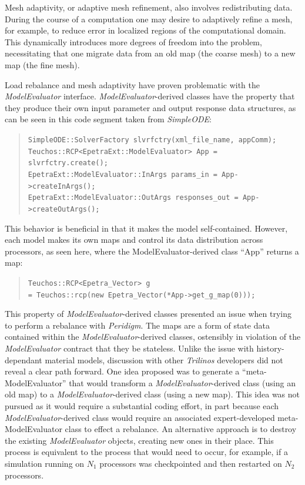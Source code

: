 \documentclass[pdf,ps2pdf,12pt,report]{SANDreport}
\theoremstyle{plain}
\theoremstyle{definition}
\theoremstyle{remark}
\numberwithin{equation}{section}
\begin{document}
Mesh adaptivity, or adaptive mesh refinement, also involves redistributing data. During the course of a computation one may desire to adaptively refine a mesh, for example, to reduce error in localized regions of the computational domain. This dynamically introduces more degrees of freedom into the problem, necessitating that one migrate data from an old map (the coarse mesh) to a new map (the fine mesh).

Load rebalance and mesh adaptivity have proven problematic with the \emph{ModelEvaluator} interface. \emph{ModelEvaluator}-derived classes have the property that they produce their own input parameter and output response data structures, as can be seen in this code segment taken from \emph{SimpleODE}:
\begin{quote}
\vspace{-5pt}
\texttt{SimpleODE::SolverFactory slvrfctry(xml\_file\_name, appComm);}\\
\texttt{Teuchos::RCP<EpetraExt::ModelEvaluator> App = slvrfctry.create();}\\
\texttt{EpetraExt::ModelEvaluator::InArgs params\_in = App->createInArgs();}\\
\texttt{EpetraExt::ModelEvaluator::OutArgs responses\_out = App->createOutArgs();}\\
\vspace{-17pt}
\end{quote}
This behavior is beneficial in that it makes the model self-contained. However, each model makes its own maps and control its data distribution across processors, as seen here, where the ModelEvaluator-derived class ``App'' returns a map:
\begin{quote}
\vspace{-5pt}
\texttt{Teuchos::RCP<Epetra\_Vector> g}\\
\texttt{= Teuchos::rcp(new Epetra\_Vector(*App->get\_g\_map(0)));}\\
\vspace{-17pt}
\end{quote}
This property of \emph{ModelEvaluator}-derived classes presented an issue when trying to perform a rebalance with \emph{Peridigm}. The maps are a form of state data contained within the \emph{ModelEvaluator}-derived classes, ostensibly in violation of the \emph{ModelEvaluator} contract that they be stateless. Unlike the issue with history-dependant material models, discussion with other \emph{Trilinos} developers did not reveal a clear path forward. One idea proposed was to generate a ``meta-ModelEvaluator'' that would transform a \emph{ModelEvaluator}-derived class (using an old map) to a \emph{ModelEvaluator}-derived class (using a new map). This idea was not pursued as it would require a substantial coding effort, in part because each \emph{ModelEvaluator}-derived class would require an associated expert-developed meta-ModelEvaluator class to effect a rebalance. An alternative approach is to destroy the existing \emph{ModelEvaluator} objects, creating new ones in their place. This process is equivalent to the process that would need to occur, for example, if a simulation running on $N_1$ processors was checkpointed and then restarted on $N_2$ processors.
\end{document}

